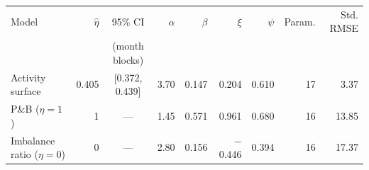 \begin{tabular}{lrcrrrrrr}
\toprule
Model & \(\hat\eta\) & 95\% CI & \(\alpha\) & \(\beta\) & \(\xi\) & \(\psi\) & Param. & Std. RMSE \\
 &  & (month blocks) &  &  &  &  &  &  \\
\midrule
Activity surface & 0.405 & [0.372, 0.439] & 3.70 & 0.147 & 0.204 & 0.610 & 17 & 3.37 \\
P\&B (\(\eta=1\)) & 1 & --- & 1.45 & 0.571 & 0.961 & 0.680 & 16 & 13.85 \\
Imbalance ratio (\(\eta=0\)) & 0 & --- & 2.80 & 0.156 & $-$0.446 & 0.394 & 16 & 17.37 \\
\bottomrule
\end{tabular}
